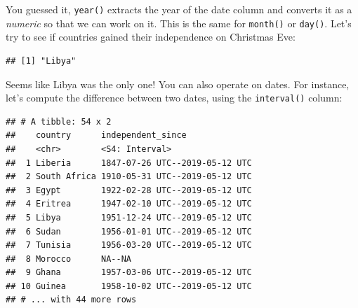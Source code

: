 \documentclass[]{gitbook}
\newenvironment{Shaded}{\begin{snugshade}}{\end{snugshade}}
\newcommand{\DataTypeTok}[1]{\textcolor[rgb]{0.13,0.29,0.53}{#1}}
\newcommand{\DecValTok}[1]{\textcolor[rgb]{0.00,0.00,0.81}{#1}}
\newcommand{\KeywordTok}[1]{\textcolor[rgb]{0.13,0.29,0.53}{\textbf{#1}}}
\newcommand{\NormalTok}[1]{#1}
\newcommand{\OperatorTok}[1]{\textcolor[rgb]{0.81,0.36,0.00}{\textbf{#1}}}
\newcommand{\StringTok}[1]{\textcolor[rgb]{0.31,0.60,0.02}{#1}}
\begin{document}
You guessed it, \texttt{year()} extracts the year of the date column and converts it as a \emph{numeric} so that we can work
on it. This is the same for \texttt{month()} or \texttt{day()}. Let's try to see if countries gained their independence on
Christmas Eve:

\begin{Shaded}
\end{Shaded}

\begin{verbatim}
## [1] "Libya"
\end{verbatim}

Seems like Libya was the only one! You can also operate on dates. For instance, let's compute the difference between
two dates, using the \texttt{interval()} column:

\begin{Shaded}
\end{Shaded}

\begin{verbatim}
## # A tibble: 54 x 2
##    country      independent_since             
##    <chr>        <S4: Interval>                
##  1 Liberia      1847-07-26 UTC--2019-05-12 UTC
##  2 South Africa 1910-05-31 UTC--2019-05-12 UTC
##  3 Egypt        1922-02-28 UTC--2019-05-12 UTC
##  4 Eritrea      1947-02-10 UTC--2019-05-12 UTC
##  5 Libya        1951-12-24 UTC--2019-05-12 UTC
##  6 Sudan        1956-01-01 UTC--2019-05-12 UTC
##  7 Tunisia      1956-03-20 UTC--2019-05-12 UTC
##  8 Morocco      NA--NA                        
##  9 Ghana        1957-03-06 UTC--2019-05-12 UTC
## 10 Guinea       1958-10-02 UTC--2019-05-12 UTC
## # ... with 44 more rows
\end{verbatim}
\end{document}
